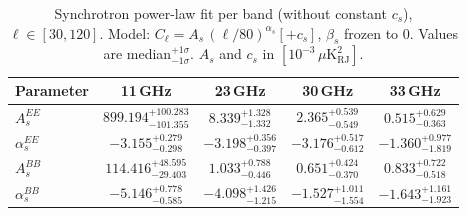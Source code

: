 \begin{table}[htbp]
\centering
\caption{Synchrotron power-law fit per band (without constant $c_s$), $\ell \in [30, 120]$. Model: $C_\ell = A_s\,(\ell/80)^{{\alpha_s}} [+ c_s]$, $\beta_s$ frozen to 0. Values are median$^{{+1\sigma}}_{{-1\sigma}}$. $A_s$ and $c_s$ in $[10^{-3}\,\mu\mathrm{K}^2_\mathrm{RJ}]$.}
\label{tab:sync_single_band_noc_ell30-120}
\begin{tabular}{lcccc}
\toprule
Parameter & 11\,GHz & 23\,GHz & 30\,GHz & 33\,GHz \\
\midrule
$A_s^{EE}$ & $899.194^{+100.283}_{-101.355}$ & $8.339^{+1.328}_{-1.332}$ & $2.365^{+0.539}_{-0.549}$ & $0.515^{+0.629}_{-0.363}$ \\
$\alpha_s^{EE}$ & $-3.155^{+0.279}_{-0.298}$ & $-3.198^{+0.356}_{-0.397}$ & $-3.176^{+0.517}_{-0.612}$ & $-1.360^{+0.977}_{-1.819}$ \\
\midrule
$A_s^{BB}$ & $114.416^{+48.595}_{-29.403}$ & $1.033^{+0.788}_{-0.446}$ & $0.651^{+0.424}_{-0.370}$ & $0.833^{+0.722}_{-0.518}$ \\
$\alpha_s^{BB}$ & $-5.146^{+0.778}_{-0.585}$ & $-4.098^{+1.426}_{-1.215}$ & $-1.527^{+1.011}_{-1.554}$ & $-1.643^{+1.161}_{-1.923}$ \\
\bottomrule
\end{tabular}
\end{table}